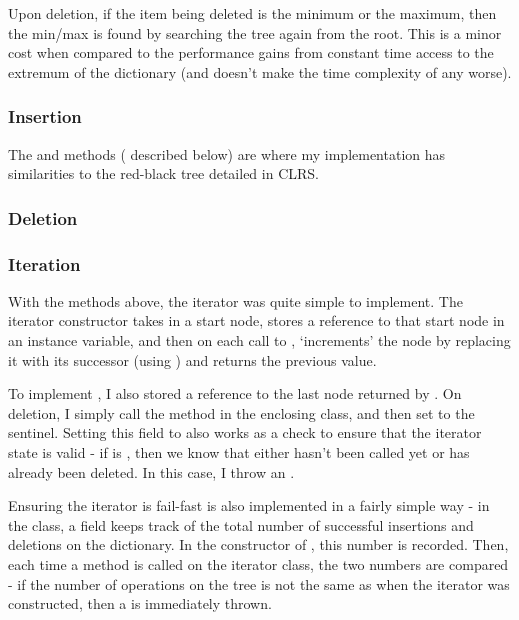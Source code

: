 Upon deletion, if the item being deleted is the minimum or the maximum, then the min/max is found by searching the tree again from the root. This is a minor cost when compared to the performance gains from constant time access to the extremum of the dictionary (and doesn't make the time complexity of  any worse).

\subsubsection{Insertion} 
The  and  methods ( described below) are where my implementation has similarities to the red-black tree detailed in CLRS. 


\subsubsection{Deletion}

\subsubsection{Iteration}

With the methods above, the iterator was quite simple to implement. The iterator constructor takes in a start node, stores a reference to that start node in an instance variable, and then on each call to , `increments' the node by replacing it with its successor (using ) and returns the previous value.

To implement , I also stored a reference to the last node returned by . On deletion, I simply call the  method in the enclosing  class, and then set  to the  sentinel. Setting this field to  also works as a check to ensure that the iterator state is valid - if  is , then we know that either  hasn't been called yet or  has already been deleted. In this case, I throw an .

Ensuring the iterator is fail-fast is also implemented in a fairly simple way - in the  class, a field  keeps track of the total number of successful insertions and deletions on the dictionary. In the constructor of , this number is recorded. Then, each time a method is called on the iterator class, the two numbers are compared - if the number of operations on the tree is not the same as when the iterator was constructed, then a  is immediately thrown.